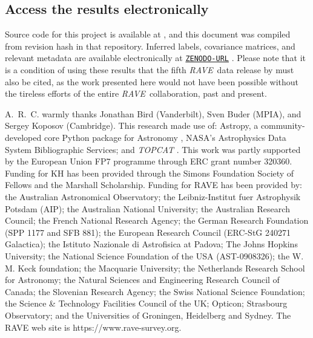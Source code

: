 \documentclass[preprint,trackchanges]{aastex}
\newcommand{\acronym}[1]{{\small{#1}}}
\newcommand{\project}[1]{\textsl{#1}}
\newcommand{\rave}{\project{\acronym{RAVE}}}
\begin{document}
\subsection*{Access the results electronically}

\noindent\colorbox{unoffensive-warning}{\parbox{\dimexpr\linewidth-2\fboxsep}{
\noindent{}Source code for this project is available at \texttt{\giturl}\hspace{-0.5em},
and this document was compiled from revision hash \texttt{\githash} in that repository.
Inferred labels, covariance matrices, and relevant metadata are available electronically
at \texttt{\url{ZENODO-URL}} \citep{DATA_REPOSITORY}.  Please note that it is a condition
of using these results that the fifth \rave\ data release by \citet{Kunder_2016} must 
also be cited, as the work presented here would not have been possible without the 
tireless efforts of the entire \rave\ collaboration, past and present.
}}

    



\acknowledgements
A.~R.~C. warmly thanks Jonathan Bird (Vanderbilt), Sven Buder (MPIA), and
Sergey Koposov (Cambridge).
This research made use of: Astropy, a community-developed core Python package for
Astronomy \citep{astropy}, NASA's Astrophysics Data System Bibliographic Services;
and \project{TOPCAT} \citep{Taylor_2005}.
This work was partly supported by the European Union FP7 programme through ERC 
grant number 320360. Funding for KH has been provided through the Simons Foundation Society of Fellows and the Marshall Scholarship.
Funding for RAVE has been provided by: the Australian Astronomical Observatory; 
the Leibniz-Institut fuer Astrophysik Potsdam (AIP); the Australian National 
University; the Australian Research Council; the French National Research Agency;
the German Research Foundation (SPP 1177 and SFB 881); the European Research 
Council (ERC-StG 240271 Galactica); the Istituto Nazionale di Astrofisica at 
Padova; The Johns Hopkins University; the National Science Foundation of the USA
(AST-0908326); the W. M. Keck foundation; the Macquarie University; the 
Netherlands Research School for Astronomy; the Natural Sciences and Engineering 
Research Council of Canada; the Slovenian Research Agency; the Swiss National 
Science Foundation; the Science \& Technology Facilities Council of the UK; 
Opticon; Strasbourg Observatory; and the Universities of Groningen, Heidelberg 
and Sydney. The RAVE web site is https://www.rave-survey.org.  
\end{document}
